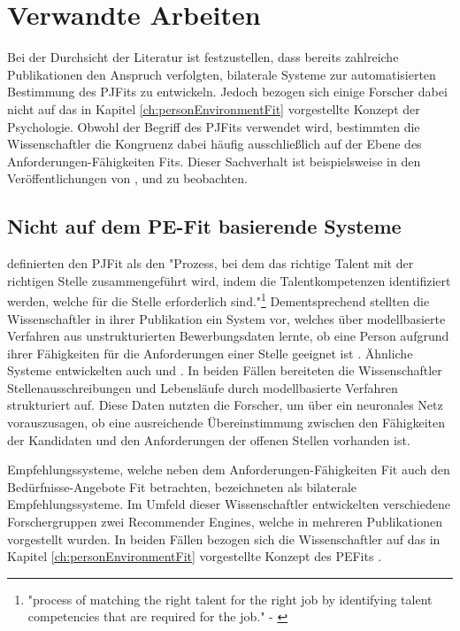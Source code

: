 \chapter{Verwandte Arbeiten}
\label{ch:verwandteArbeiten}
Bei der Durchsicht der Literatur ist festzustellen, dass bereits zahlreiche Publikationen den Anspruch verfolgten, bilaterale Systeme zur automatisierten Bestimmung des \acp{PJFit} zu entwickeln. Jedoch bezogen sich einige Forscher dabei nicht auf das in Kapitel \ref{ch:personEnvironmentFit} vorgestellte Konzept der Psychologie. Obwohl der Begriff des \acp{PJFit} verwendet wird, bestimmten die Wissenschaftler die Kongruenz dabei häufig ausschließlich auf der Ebene des Anforderungen-Fähigkeiten Fits. Dieser Sachverhalt ist beispielsweise in den Veröffentlichungen von \textcite[S. 1ff.]{luo:2019}, \textcite[S. 1ff.]{qin:2018} und \textcite[S. 1ff.]{personJobFit:2018} zu beobachten.

\section{Nicht auf dem PE-Fit basierende Systeme}
\label{ch:verwandteArbeiten:nichtAufDemPEFitBasierend}
\textcite[S. 1, Z. 1f.]{personJobFit:2018} definierten den \ac{PJFit} als den "Prozess, bei dem das richtige Talent mit der richtigen Stelle zusammengeführt wird, indem die Talentkompetenzen identifiziert werden, welche für die Stelle erforderlich sind."\footnote{"process of matching the right talent for the right job by identifying talent competencies that are required for the job." - \textcite[S. 1, Z. 1f.]{personJobFit:2018}} Dementsprechend stellten die Wissenschaftler in ihrer Publikation ein System vor, welches über modellbasierte Verfahren aus unstrukturierten Bewerbungsdaten lernte, ob eine Person aufgrund ihrer Fähigkeiten für die Anforderungen einer Stelle geeignet ist \cite[S. 1ff.]{personJobFit:2018}. Ähnliche Systeme entwickelten auch \textcite[S. 1ff.]{qin:2018} und \textcite[S. 1ff.]{luo:2019}. In beiden Fällen bereiteten die Wissenschaftler Stellenausschreibungen und Lebensläufe durch modellbasierte Verfahren strukturiert auf. Diese Daten nutzten die Forscher, um über ein neuronales Netz vorauszusagen, ob eine ausreichende Übereinstimmung zwischen den Fähigkeiten der Kandidaten und den Anforderungen der offenen Stellen vorhanden ist. 

Empfehlungssysteme, welche neben dem Anforderungen-Fähigkeiten Fit auch den Bedürfnisse-Angebote Fit betrachten, bezeichneten \textcite[S. 4]{malinowski:2006} als bilaterale Empfehlungssysteme. Im Umfeld dieser Wissenschaftler entwickelten verschiedene Forschergruppen zwei Recommender Engines, welche in mehreren Publikationen vorgestellt wurden. In beiden Fällen bezogen sich die Wissenschaftler auf das in Kapitel \ref{ch:personEnvironmentFit} vorgestellte Konzept des \acp{PEFit} \cite[S. 4f.]{keim:2007}\cite[S. 3f.]{keim:2005}\cite[S. 3f.]{malinowski:2005}\cite[S. 3f.]{malinowski:2006}\cite[S. 3ff.]{malinowski:2008}.

